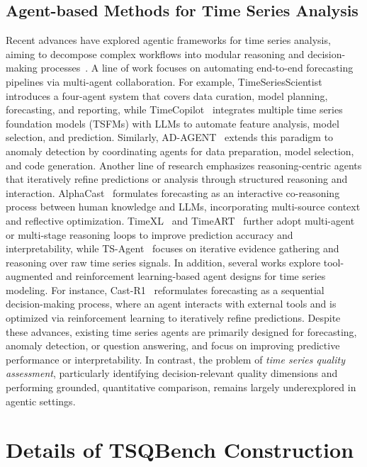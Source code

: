 \documentclass{article}
\begin{document}
\subsection{Agent-based Methods for Time Series Analysis}
Recent advances have explored agentic frameworks for time series analysis, aiming to decompose complex workflows into modular reasoning and decision-making processes~\citep{cheng2026position}. A line of work focuses on automating end-to-end forecasting pipelines via multi-agent collaboration. For example, TimeSeriesScientist~\citep{zhao2025timeseriesscientist} introduces a four-agent system that covers data curation, model planning, forecasting, and reporting, while TimeCopilot~\citep{garza2025timecopilot} integrates multiple time series foundation models (TSFMs) with LLMs to automate feature analysis, model selection, and prediction. Similarly, AD-AGENT~\citep{yang2025ad} extends this paradigm to anomaly detection by coordinating agents for data preparation, model selection, and code generation.
Another line of research emphasizes reasoning-centric agents that iteratively refine predictions or analysis through structured reasoning and interaction. AlphaCast~\citep{zhang2025alphacast} formulates forecasting as an interactive co-reasoning process between human knowledge and LLMs, incorporating multi-source context and reflective optimization. TimeXL~\citep{jiang2025timexl} and TimeART~\citep{wu2026timeart} further adopt multi-agent or multi-stage reasoning loops to improve prediction accuracy and interpretability, while TS-Agent~\citep{liu2025ts} focuses on iterative evidence gathering and reasoning over raw time series signals.
In addition, several works explore tool-augmented and reinforcement learning-based agent designs for time series modeling. For instance, Cast-R1~\citep{tao2026cast} reformulates forecasting as a sequential decision-making process, where an agent interacts with external tools and is optimized via reinforcement learning to iteratively refine predictions.
Despite these advances, existing time series agents are primarily designed for forecasting, anomaly detection, or question answering, and focus on improving predictive performance or interpretability. In contrast, the problem of \emph{time series quality assessment}, particularly identifying decision-relevant quality dimensions and performing grounded, quantitative comparison, remains largely underexplored in agentic settings.





\section{Details of TSQBench Construction}
\label{app:benchmark}
\end{document}
